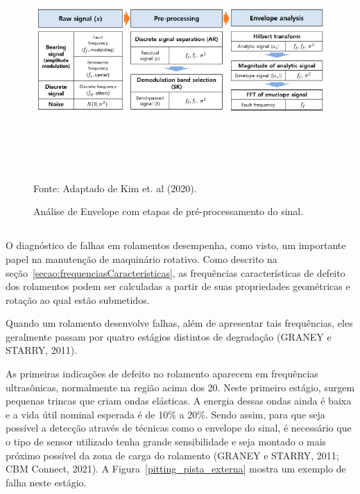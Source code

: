 \documentclass[
	12pt,				
	oneside,			
	a4paper,			
	english,			
	brazil,			
	]{abntex2ppgsi}
\begin{document}
\begin{figure}[H]
\centering
\caption {Análise de Envelope com etapas de pré-processamento do sinal.}
\includegraphics[width=\textwidth,height=90mm,keepaspectratio]{envelope_kim} \\
Fonte: Adaptado de Kim et. al (2020).
\label{envelope_kim}
\end{figure}

\subsection{}

O diagnóstico de falhas em rolamentos desempenha, como visto, um importante papel na manutenção de maquinário rotativo. Como descrito na seção~\ref{secao:frequenciasCaracteristicas}, as frequências características de defeito dos rolamentos podem ser calculadas a partir de suas propriedades geométricas e rotação ao qual estão submetidos. 

Quando um rolamento desenvolve falhas, além de apresentar tais frequências, eles geralmente passam por quatro estágios distintos de degradação (GRANEY e STARRY, 2011). 

As primeiras indicações de defeito no rolamento aparecem em frequências ultrasônicas, normalmente na região acima dos \SI{20}{\kilo{\hertz}}. Neste primeiro estágio, surgem pequenas trincas que criam ondas elásticas. A energia dessas ondas ainda é baixa e a vida útil nominal esperada é de 10\% a 20\%. Sendo assim, para que seja possível a detecção através de técnicas como o envelope do sinal, é necessário que o tipo de sensor utilizado tenha grande sensibilidade e seja montado o mais próximo possível da zona de carga do rolamento (GRANEY e STARRY, 2011; CBM Connect, 2021). A Figura~\ref{pitting_pista_externa} mostra um exemplo de falha neste estágio.
\end{document}
